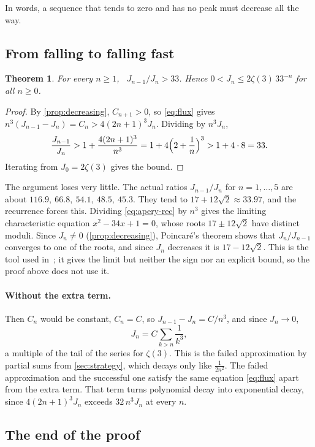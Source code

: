 \documentclass[11pt]{article}
\theoremstyle{plain}
\newtheorem{theorem}{Theorem}[section]
\theoremstyle{definition}
\theoremstyle{remark}
\begin{document}
In words, a sequence that tends to zero and has no peak must decrease all the way.

\subsection{From falling to falling fast}

\begin{theorem}\label{thm:decay2}
For every $n\ge1$, \ $J_{n-1}/J_n>33$. Hence $0<J_n\le2\zeta(3)\,33^{-n}$ for all $n\ge0$.
\end{theorem}

\begin{proof}
By \cref{prop:decreasing}, $C_{n+1}>0$, so \eqref{eq:flux} gives $n^3(J_{n-1}-J_n)=C_n>4(2n+1)^3J_n$.
Dividing by $n^3J_n$,
\[
  \frac{J_{n-1}}{J_n}>1+\frac{4(2n+1)^3}{n^3}=1+4\Bigl(2+\frac1n\Bigr)^3>1+4\cdot8=33 .
\]
Iterating from $J_0=2\zeta(3)$ gives the bound.
\end{proof}

The argument loses very little. The actual ratios $J_{n-1}/J_n$ for $n=1,\dots,5$ are about
$116.9,\ 66.8,\ 54.1,\ 48.5,\ 45.3$. They tend to $17+12\sqrt2\approx33.97$, and the recurrence
forces this. Dividing \eqref{eq:apery-rec} by $n^3$ gives the limiting characteristic equation
$x^2-34x+1=0$, whose roots $17\pm12\sqrt2$ have distinct moduli. Since $J_n\ne0$
(\cref{prop:decreasing}), Poincar\'e's theorem shows that $J_n/J_{n-1}$ converges to one of the
roots, and since $J_n$ decreases it is $17-12\sqrt2$. This is the tool used in~\cite{rajkumar}; it
gives the limit but neither the sign nor an explicit bound, so the proof above does not use it.

\paragraph{Without the extra term.} Then $C_n$ would be constant, $C_n=C$, so
$J_{n-1}-J_n=C/n^3$, and since $J_n\to0$,
\[
  J_n=C\sum_{k>n}\frac1{k^3},
\]
a multiple of the tail of the series for $\zeta(3)$. This is the failed approximation by
partial sums from \cref{sec:strategy}, which decays only like $\frac1{2n^2}$. The failed
approximation and the successful one satisfy the same equation \eqref{eq:flux} apart from the
extra term. That term turns polynomial decay into exponential decay, since $4(2n+1)^3J_n$ exceeds
$32\,n^3J_n$ at every $n$.

\subsection{The end of the proof}
\end{document}
